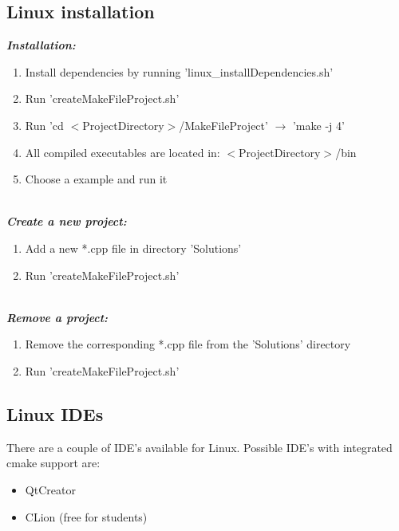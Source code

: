 \documentclass[]{article}
\begin{document}
\subsection{Linux installation}

\textit{\textbf{Installation:}}
\begin{enumerate}
	\item Install dependencies by running 'linux\_installDependencies.sh'
	\item Run 'createMakeFileProject.sh'
	\item Run 'cd $<$ProjectDirectory$>$/MakeFileProject' $\rightarrow$ 'make -j 4'
	\item All compiled executables are located in: $<$ProjectDirectory$>$/bin
	\item Choose a example and run it 
\end{enumerate}

\mbox{} \\
\textit{\textbf{Create a new project:}}
\begin{enumerate}
\item Add a new *.cpp file in directory 'Solutions'
\item Run 'createMakeFileProject.sh' 
\end{enumerate}

\mbox{} \\
\textit{\textbf{Remove a project:}}
\begin{enumerate}
\item Remove the corresponding *.cpp file from the 'Solutions' directory
\item Run 'createMakeFileProject.sh' 
\end{enumerate}

\subsection{Linux IDEs}

There are a couple of IDE's available for Linux. Possible IDE's with integrated cmake support are: 
\begin{itemize}
\item QtCreator
\item CLion (free for students)
\end{itemize}
\end{document}
